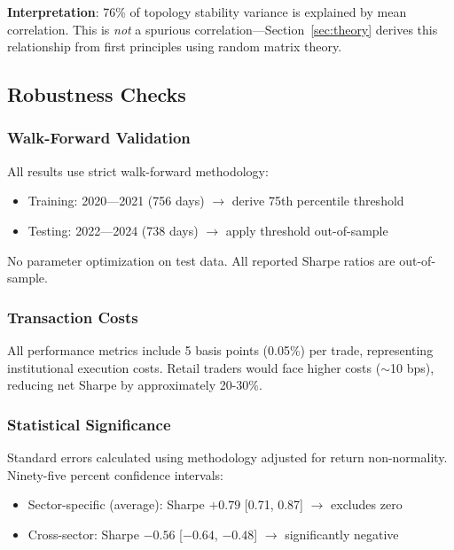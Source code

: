 \textbf{Interpretation}: 76\% of topology stability variance is explained by mean correlation. This is \textit{not} a spurious correlation—Section~\ref{sec:theory} derives this relationship from first principles using random matrix theory.

\subsection{Robustness Checks}

\subsubsection{Walk-Forward Validation}

All results use strict walk-forward methodology:
\begin{itemize}
    \item Training: 2020---2021 (756 days) $\rightarrow$ derive 75th percentile threshold
    \item Testing: 2022---2024 (738 days) $\rightarrow$ apply threshold out-of-sample
\end{itemize}

No parameter optimization on test data. All reported Sharpe ratios are out-of-sample.

\subsubsection{Transaction Costs}

All performance metrics include 5 basis points (0.05\%) per trade, representing institutional execution costs. Retail traders would face higher costs ($\sim$10 bps), reducing net Sharpe by approximately 20-30\%.

\subsubsection{Statistical Significance}

Standard errors calculated using \citet{Lo2002} methodology adjusted for return non-normality. Ninety-five percent confidence intervals:
\begin{itemize}
    \item Sector-specific (average): Sharpe $+0.79$ [0.71, 0.87] $\rightarrow$ excludes zero
    \item Cross-sector: Sharpe $-0.56$ [$-0.64$, $-0.48$] $\rightarrow$ significantly negative
\end{itemize}

